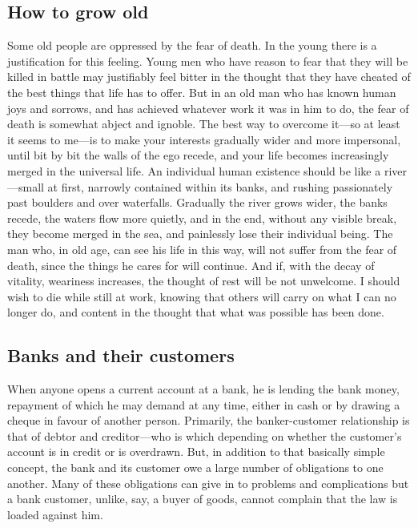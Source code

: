 \documentclass[11pt]{article}
\begin{document}
\subsection{How to grow old}
\label{sec-2-11}

Some old people are oppressed by the fear of death. In the young there is a justification for this feeling. Young men who have reason to fear that they will be killed in battle may justifiably feel bitter in the thought that they have cheated of the best things that life has to offer. But in an old man who has known human joys and sorrows, and has achieved whatever work it was in him to do, the fear of death is somewhat abject and ignoble. The best way to overcome it---so at least it seems to me---is to make your interests gradually wider and more impersonal, until bit by bit the walls of the ego recede, and your life becomes increasingly merged in the universal life. An individual human existence should be like a river---small at first, narrowly contained within its banks, and rushing passionately past boulders and over waterfalls. Gradually the river grows wider, the banks recede, the waters flow more quietly, and in the end, without any visible break, they become merged in the sea, and painlessly lose their individual being. The man who, in old age, can see his life in this way, will not suffer from the fear of death, since the things he cares for will continue. And if, with the decay of vitality, weariness increases, the thought of rest will be not unwelcome. I should wish to die while still at work, knowing that others will carry on what I can no longer do, and content in the thought that what was possible has been done.
\subsection{Banks and their customers}
\label{sec-2-12}

When anyone opens a current account at a bank, he is lending the bank money, repayment of which he may demand at any time, either in cash or by drawing a cheque in favour of another person. Primarily, the banker-customer relationship is that of debtor and creditor---who is which depending on whether the customer's account is in credit or is overdrawn. But, in addition to that basically simple concept, the bank and its customer owe a large number of obligations to one another. Many of these obligations can give in to problems and complications but a bank customer, unlike, say, a buyer of goods, cannot complain that the law is loaded against him.
\end{document}
